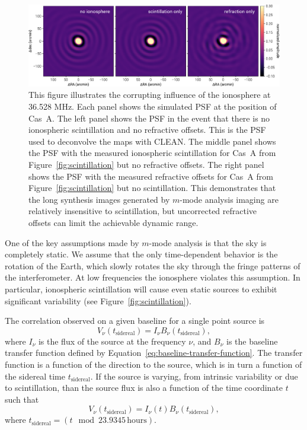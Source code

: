 \documentclass[twocolumn]{aastex61}
\begin{document}
\begin{figure}[t]
    \includegraphics[width=\textwidth]{figures/ionospheric-simulations/ionospheric-simulations}
    \caption{
        This figure illustrates the corrupting influence of the ionosphere at 36.528 MHz. Each panel
        shows the simulated PSF at the position of Cas~A. The left panel shows the PSF in the event
        that there is no ionospheric scintillation and no refractive offsets. This is the PSF used
        to deconvolve the maps with CLEAN. The middle panel shows the PSF with the measured
        ionospheric scintillation for Cas~A from Figure~\ref{fig:scintillation} but no refractive
        offsets. The right panel shows the PSF with the measured refractive offsets for Cas~A from
        Figure~\ref{fig:scintillation} but no scintillation. This demonstrates that the long
        synthesis images generated by $m$-mode analysis imaging are relatively insensitive to
        scintillation, but uncorrected refractive offsets can limit the achievable dynamic range.
    }
    \label{fig:ionospheric-simulations}
\end{figure}

One of the key assumptions made by $m$-mode analysis is that the sky is completely static.  We
assume that the only time-dependent behavior is the rotation of the Earth, which slowly rotates the
sky through the fringe patterns of the interferometer. At low frequencies the ionosphere violates
this assumption. In particular, ionospheric scintillation will cause even static sources to exhibit
significant variability (see Figure~\ref{fig:scintillation}).

The correlation observed on a given baseline for a single point source is
\begin{equation}
    V_\nu(t_{\textrm{sidereal}}) = I_\nu B_\nu(t_{\textrm{sidereal}}),
\end{equation}
where $I_\nu$ is the flux of the source at the frequency $\nu$, and $B_\nu$ is the baseline transfer
function defined by Equation~\ref{eq:baseline-transfer-function}. The transfer function is a
function of the direction to the source, which is in turn a function of the sidereal time
$t_{\textrm{sidereal}}$. If the source is varying, from intrinsic variability or due to
scintillation, than the source flux is also a function of the time coordinate $t$ such that
\begin{equation}
    V_\nu(t_{\textrm{sidereal}}) = I_\nu(t) B_\nu(t_{\textrm{sidereal}}),
\end{equation}
where $t_{\textrm{sidereal}} = (t \mod 23.9345\,\textrm{hours})$.
\end{document}
